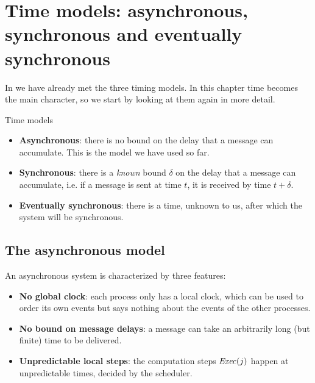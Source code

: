 
\newcommand{\delayaxes}[2]{%
  \draw[-{Latex}] (0,0) -- (#1,0) node[below left, font=\scriptsize] {time};
  \draw[-{Latex}] (0,0) -- (0,2.6) node[left, font=\scriptsize] {delay};
  \draw[dashed, BrickRed] (0,#2) -- (#1-0.2,#2) node[above left, font=\scriptsize, text=BrickRed] {threshold};
}

\section{Time models: asynchronous, synchronous and eventually synchronous}

In  we have already met the three timing models. In this chapter time becomes the main character, so we start by looking at them again in more detail.

\begin{frameddefn}[label={def:time-models-2}]{Time models}
  \begin{itemize}
    \item \textbf{Asynchronous}: there is no bound on the delay that a message can accumulate. This is the model we have used so far.
    \item \textbf{Synchronous}: there is a \textit{known} bound $\delta$ on the delay that a message can accumulate, i.e. if a message is sent at time $t$, it is received by time $t + \delta$.
    \item \textbf{Eventually synchronous}: there is a time, unknown to us, after which the system will be synchronous.
  \end{itemize}
\end{frameddefn}

\subsection{The asynchronous model}

An asynchronous system is characterized by three features:
\begin{itemize}
  \item \textbf{No global clock}: each process only has a local clock, which can be used to order its own events but says nothing about the events of the other processes.
  \item \textbf{No bound on message delays}: a message can take an arbitrarily long (but finite) time to be delivered.
  \item \textbf{Unpredictable local steps}: the computation steps $\mathit{Exec}(j)$ happen at unpredictable times, decided by the scheduler.
\end{itemize}

